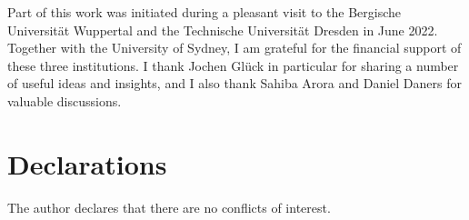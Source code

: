 \documentclass[sn-mathphys]{sn-jnl}%
\theoremstyle{thmstyleone}
\theoremstyle{thmstylethree}
\begin{document}
\backmatter






Part of this work was initiated during a pleasant visit to the Bergische Universit\"{a}t Wuppertal and the Technische Universit\"{a}t Dresden in June 2022. Together with the University of Sydney, I am grateful for the financial support of these three institutions. I thank Jochen Gl\"{u}ck in particular for sharing a number of useful ideas and insights, and I also thank Sahiba Arora and Daniel Daners for valuable discussions.

\section*{Declarations}


The author declares that there are no conflicts of interest.

\end{document}

